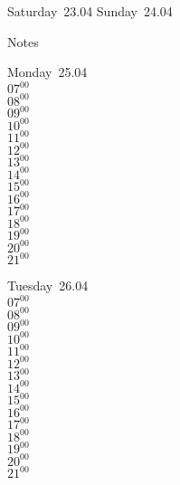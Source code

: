 \documentclass[11pt,a4paper]{book}\usepackage[]{graphicx}\usepackage[]{color}
\begin{document}
\begin{weekendbox}
  Saturday~23.04
  \tcblower
  Sunday~24.04
\end{weekendbox} %
\begin{notebox}
  Notes
\end{notebox}
\clearpage
\begin{headerbox}
\end{headerbox}
\begin{weekdaybox}
  Monday~25.04\\
  { 
  \vfill
  $07^{00}$\\
$08^{00}$\\
$09^{00}$\\
$10^{00}$\\
$11^{00}$\\
$12^{00}$\\
$13^{00}$\\
$14^{00}$\\
$15^{00}$\\
$16^{00}$\\
$17^{00}$\\
$18^{00}$\\
$19^{00}$\\
$20^{00}$\\
$21^{00}$\\
  }
\end{weekdaybox}
\begin{weekdaybox}
  Tuesday~26.04\\
  { 
  \vfill
  $07^{00}$\\
$08^{00}$\\
$09^{00}$\\
$10^{00}$\\
$11^{00}$\\
$12^{00}$\\
$13^{00}$\\
$14^{00}$\\
$15^{00}$\\
$16^{00}$\\
$17^{00}$\\
$18^{00}$\\
$19^{00}$\\
$20^{00}$\\
$21^{00}$\\
  }
\end{weekdaybox}
\end{document}
